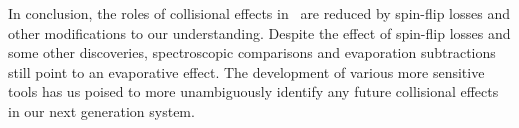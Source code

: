 \documentclass[%
 reprint,
 amsmath,amssymb,
 aps,
pra,
]{revtex4-1}
\begin{document}

In conclusion, the roles of collisional effects in~\cite{Stuhl2013,Stuhl2012evap} are reduced by spin-flip losses and other modifications to our understanding.
Despite the effect of spin-flip losses and some other discoveries, spectroscopic comparisons and evaporation subtractions still point to an evaporative effect. 
The development of various more sensitive tools has us poised to more unambiguously identify any future collisional effects in our next generation system.



\end{document}
